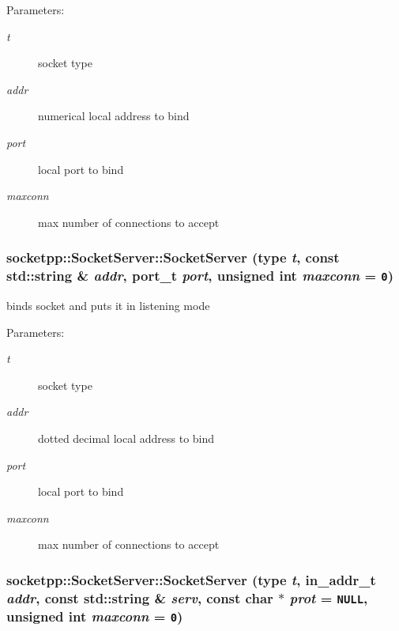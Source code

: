 \begin{Desc}
\item[Parameters:]
\begin{description}
\item[{\em t}]socket type \item[{\em addr}]numerical local address to bind \item[{\em port}]local port to bind \item[{\em maxconn}]max number of connections to accept \end{description}
\end{Desc}
\hypertarget{classsocketpp_1_1SocketServer_2b43397fd614dc7953559d7372f1c6ca}{
\subsubsection{\setlength{\rightskip}{0pt plus 5cm}socketpp::SocketServer::SocketServer (type {\em t}, \/  const std::string \& {\em addr}, \/  port\_\-t {\em port}, \/  unsigned int {\em maxconn} = {\tt 0})}}
\label{classsocketpp_1_1SocketServer_2b43397fd614dc7953559d7372f1c6ca}


binds socket and puts it in listening mode 

\begin{Desc}
\item[Parameters:]
\begin{description}
\item[{\em t}]socket type \item[{\em addr}]dotted decimal local address to bind \item[{\em port}]local port to bind \item[{\em maxconn}]max number of connections to accept \end{description}
\end{Desc}
\hypertarget{classsocketpp_1_1SocketServer_594f3a739f4cd053f9fd0512e42473be}{
\subsubsection{\setlength{\rightskip}{0pt plus 5cm}socketpp::SocketServer::SocketServer (type {\em t}, \/  in\_\-addr\_\-t {\em addr}, \/  const std::string \& {\em serv}, \/  const char $\ast$ {\em prot} = {\tt NULL}, \/  unsigned int {\em maxconn} = {\tt 0})}}
\label{classsocketpp_1_1SocketServer_594f3a739f4cd053f9fd0512e42473be}



